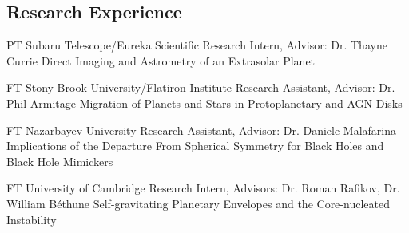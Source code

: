\documentclass[10pt]{article} %
\begin{document}
\begin{paracol}{1}
\section{Research Experience}





{PT} %
{Subaru Telescope/Eureka Scientific} %
{Research Intern, Advisor: Dr. Thayne Currie} %
{Direct Imaging and Astrometry of an Extrasolar Planet} %

{FT} %
{Stony Brook University/Flatiron Institute} %
{Research Assistant, Advisor: Dr. Phil Armitage} %
{Migration of Planets and Stars in Protoplanetary and AGN Disks} %


{FT} %
{Nazarbayev University} %
{Research Assistant, Advisor: Dr. Daniele Malafarina} %
{Implications of the Departure From Spherical Symmetry for Black Holes and Black Hole Mimickers%
}  %


{FT} %
{University of Cambridge} %
{Research Intern, Advisors: Dr. Roman Rafikov, Dr. William B\'ethune} %
{Self-gravitating Planetary Envelopes and the Core-nucleated Instability%
} %


\end{paracol}
\end{document}
